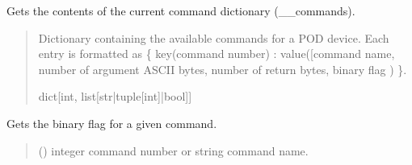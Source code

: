 \documentclass[letterpaper,10pt,english]{sphinxmanual}
\begin{document}
\begin{fulllineitems}
\begin{fulllineitems}
\label{\detokenize{PodCommands:PodCommands.POD_Commands.GetCommands}}
\pysigstartsignatures
{}
\pysigstopsignatures
\sphinxAtStartPar
Gets the contents of the current command dictionary (\_\_commands).
\begin{quote}\begin{description}
\sphinxAtStartPar
Dictionary containing the available commands for a POD                 device. Each entry is formatted as \{ key(command number) : value({[}command name, number of                 argument ASCII bytes, number of return bytes, binary flag ) \}.

\sphinxAtStartPar
dict{[}int, list{[}str|tuple{[}int{]}|bool{]}{]}

\end{description}\end{quote}

\end{fulllineitems}


\begin{fulllineitems}
\label{\detokenize{PodCommands:PodCommands.POD_Commands.IsCommandBinary}}
\pysigstartsignatures
{}
\pysigstopsignatures
\sphinxAtStartPar
Gets the binary flag for a given command.
\begin{quote}\begin{description}
\sphinxAtStartPar
{} (\sphinxstyleliteralemphasis{\sphinxupquote{ | }}) \textendash{} integer command number or string command name.


\end{description}
\end{quote}
\end{fulllineitems}
\end{fulllineitems}
\end{document}
